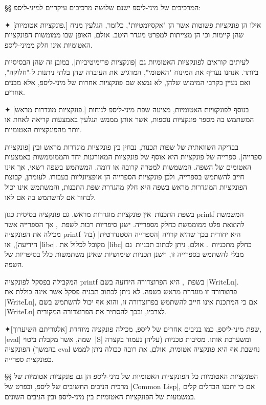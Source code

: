 §§ המרכיבים של מיני-ליספ
ישנם שלושה מרכיבים עיקריים למיני-ליספ:
\begin{description}
  ✦ [פונקציות אטומיות.] אילו הן פונקציות פשוטות אשר הן "אקסיומטיות", כלומר,
  הגלעין מניח שהן קיימות וכי הן מצייתות למפרט מוגדר היטב. אולם, האופן שבו
  ממומשות הפונקציות האטומיות אינו חלק ממיני-ליספ.

  לעיתים קוראים לפונקציות האטומיות גם \ע|פונקציות פרימיטיביות|, במובן זה שהן
  הבסיסיות ביותר. אנחנו נעדיף את המינוח "האטומי", המדגיש את העובדה שהן בלתי
  ניתנות ל-"חלוקה", ואם נעיין בקרבי המימוש שלהן, לא נמצא שם פונקציות אחרות של
  מיני-ליספ, אלא מבנים אחרים.

  ✦ [פונקציות מוגדרות מראש.] בנוסף לפונקציות האטומיות, מציעה שפת מיני-ליספ
  לנוחות המשתמש בה מספר פונקציות נוספות, אשר אותן מממש הגלעין באמצעות קריאה
  לאחת או יותר מהפונקציות האטומיות.

  בבדיקה השוואתית של שפות תכנות, נבחין בין פונקציות מוגדרות מראש ובין
  \ע|פונקציות ספרייה|. ספרייה של פונקציות היא אוסף של פונקציות המאורגנות יחד
  והממוממשות באמצעות האטומים של השפה. המשמשות למטרה קרובה או דומה. המשתמש בשפה
  רשאי, אך אינו חייב להשתמש בספרייה, ולכן פונקציות הספרייה הן אופציונליות
  בעבורו. לעומתן, קבוצת הפונקציות המוגדרות מראש בשפה היא חלק מהגדרת שפת התכנות,
  והמשתמש אינו יכול לבחור אם להשתמש בה אם לאו.

  בשפת התכנות~\CPL אין פונקציות מוגדרות מראש. גם פונקציה בסיסית כגון printf
  המשמשת להוצאת פלט ממוממשת כחלק מספרייה. ישנן סיפריות רבות לשפת~\CPL, אך
  הספרייה אשר מכילה את הפונקציה printf היא יחודית בכך שהיא קרויה \ע|הספרייה
  הסטנדרטית| (בה' הידיעה), או \E|libc|. מקובל לכלול את \E|libc| כחלק
  מתכניות~\CPL. אולם, ניתן לכתוב תכניות~\CPL גם מבלי להשתמש בספרייה זו, וישנן
  תכניות שימושיות שאינן משתמשות כלל בסיפריות של השפה.

  המקבילה בפסקל לפונקציה printf בשפת~\CPL, היא הפרוצדורה הידועה בשם
  \E|WriteLn|. פרוצדורה זו מוגדרת מראש בשפה. לא ניתן לכתוב תכנית פסקל אשר אינה
  כוללת את \E|WriteLn|, אם כי המתכנת אינו חייב להשתמש בפרוצדורה זו, והוא אף
  יכול להשתמש בשם \E|WriteLn| לצרכיו, ובכך להסתיר את הפרוצדורה המקורית.

  ✦[אלגוריתם השיערוך] שפת מיני-ליספ, כמו בניבים אחרים של ליספ, מכילה פונקציה
  מיוחדת, \E|eval| שמה, אשר מקבלת ביטוי~\E|S| ומשערכת אותו. מסיבות טכניות
  (עליהן נעמוד בקצרה בהמשך) הפונקציה eval נחשבת אף היא פונקציה אטומית, אולם, את
  רובה ככולה ניתן לממש כפונקצית ספרייה.
\end{description}

§§ הפונקציות האטומיות
כל הפונקציות האטומיות של מיני-ליספ הן גם פונקציות אטומיות של מרבית הניבים
החשובים של ליספ, ובפרט של \E|Common Lisp|, אם כי יתכנו הבדלים קלים במשמעות של
הפונקציות האטומיות בין מיני-ליספ ובין הניבים השונים.

